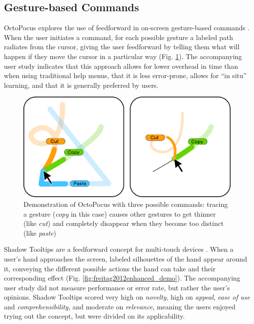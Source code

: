 \documentclass[a4paper]{article}
\begin{document}
	\subsection{Gesture-based Commands} \label{subsec:gesture-based_commands}
	OctoPocus explores the use of feedforward in on-screen gesture-based commands \cite{bau2008octopocus}. When the user initiates a command, for each possible gesture a labeled path radiates from the cursor, giving the user feedforward by telling them what will happen if they move the cursor in a particular way (Fig. \ref{fig:bau2008octopocus_demo}). The accompanying user study indicates that this approach allows for lower overhead in time than when using traditional help menus, that it is less error-prone, allows for ``in situ'' learning, and that it is generally preferred by users.

	\begin{figure}
		\centering
		\includegraphics[width=0.7\linewidth]{img/bau2008octopocus/demo.png}
		\caption{Demonstration of OctoPocus with three possible commands: tracing a gesture (\textit{copy} in this case) causes other gestures to get thinner (like \textit{cut}) and completely disappear when they become too distinct (like \textit{paste}) \cite{bau2008octopocus}}
		\label{fig:bau2008octopocus_demo}
	\end{figure}

	Shadow Tooltips are a feedforward concept for multi-touch devices \cite{freitag2012enhanced}. When a user's hand approaches the screen, labeled silhouettes of the hand appear around it, conveying the different possible actions the hand can take and their corresponding effect (Fig. \ref{fig:freitag2012enhanced_demo}). The accompanying user study did not measure performance or error rate, but rather the user's opinions. Shadow Tooltips scored very high on \textit{novelty}, high on \textit{appeal}, \textit{ease of use} and \textit{comprehensibility}, and moderate on \textit{relevance}, meaning the users enjoyed trying out the concept, but were divided on its applicability.
\end{document}
